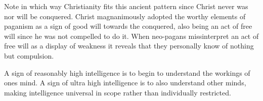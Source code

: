 \begin{footnotesize}
\begin{sffamily}
Note in which way Christianity fits this ancient pattern since Christ never was nor will be conquered. Christ magnanimously adopted the worthy elements of paganism as a sign of good will towards the conquered, also being an act of free will since he was not compelled to do it. When neo-pagans missinterpret an act of free will as a display of weakness it reveals that they personally know of nothing but compulsion.

A sign of reasonably high intelligence is to begin to understand the workings of ones mind. A sign of ultra high intelligence is to also understand other minds, making intelligence universal in scope rather than individually restricted.

\end{sffamily}
\end{footnotesize}


